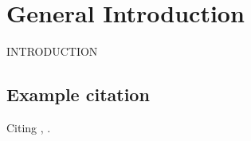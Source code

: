 \chapter{General Introduction}
\setcounter{page}{1}
INTRODUCTION

\section{Example citation}
Citing \cite{authorjear}, \citep{authorjear}.
